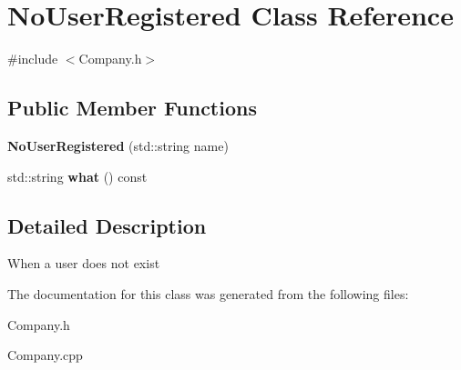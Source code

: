 \hypertarget{class_no_user_registered}{}\section{No\+User\+Registered Class Reference}
\label{class_no_user_registered}


{\ttfamily \#include $<$Company.\+h$>$}

\subsection*{Public Member Functions}
\begin{DoxyCompactItemize}
\item 
\mbox{\label{class_no_user_registered_a928e78029870899c7dceeb95be5ed1d9}} 
{\bfseries No\+User\+Registered} (std\+::string name)
\item 
\mbox{\label{class_no_user_registered_a07aae9e65baf017e03fbe3445ff5ec37}} 
std\+::string {\bfseries what} () const
\end{DoxyCompactItemize}


\subsection{Detailed Description}
When a user does not exist 

The documentation for this class was generated from the following files\+:\begin{DoxyCompactItemize}
\item 
Company.\+h\item 
Company.\+cpp\end{DoxyCompactItemize}
